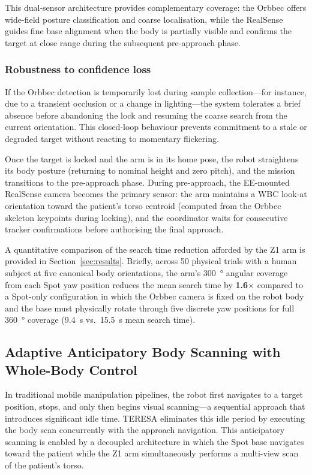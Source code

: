 This dual-sensor architecture provides complementary coverage: the Orbbec
offers wide-field posture classification and coarse localisation, while the
RealSense guides fine base alignment when the body is partially visible and
confirms the target at close range during the subsequent pre-approach phase.

\subsubsection{Robustness to confidence loss}

If the Orbbec detection is temporarily lost during sample collection---for
instance, due to a transient occlusion or a change in lighting---the system
tolerates a brief absence before abandoning the lock and resuming the coarse
search from the current orientation. This closed-loop behaviour prevents
commitment to a stale or degraded target without reacting to momentary
flickering.

Once the target is locked and the arm is in its home pose, the robot
straightens its body posture (returning to nominal height and zero pitch),
and the mission transitions to the pre-approach phase. During pre-approach,
the \ac{EE}-mounted RealSense camera becomes the primary sensor: the arm
maintains a \ac{WBC} look-at orientation toward the patient's torso centroid
(computed from the Orbbec skeleton keypoints during locking), and the
coordinator waits for consecutive tracker confirmations before authorising
the final approach.

A quantitative comparison of the search time reduction afforded by the
Z1 arm is provided in Section~\ref{sec:results}.  Briefly, across 50
physical trials with a human subject at five canonical body orientations,
the arm's \SI{300}{\degree} angular coverage from each Spot yaw position
reduces the mean search time by \textbf{1.6}$\times$ compared to a
Spot-only configuration in which the Orbbec camera is fixed on the robot
body and the base must physically rotate through five discrete yaw
positions for full \SI{360}{\degree} coverage (\SI{9.4}{\second} vs.\
\SI{15.5}{\second} mean search time).

\subsection{Adaptive Anticipatory Body Scanning with Whole-Body Control}
\label{sec:anticipatory_scan}

In traditional mobile manipulation pipelines, the robot first navigates to a
target position, stops, and only then begins visual scanning---a sequential
approach that introduces significant idle time. \ac{TERESA} eliminates this
idle period by executing the body scan concurrently with the approach
navigation. This anticipatory scanning is enabled by a decoupled architecture
in which the Spot base navigates toward the patient while the Z1 arm
simultaneously performs a multi-view scan of the patient's torso.

